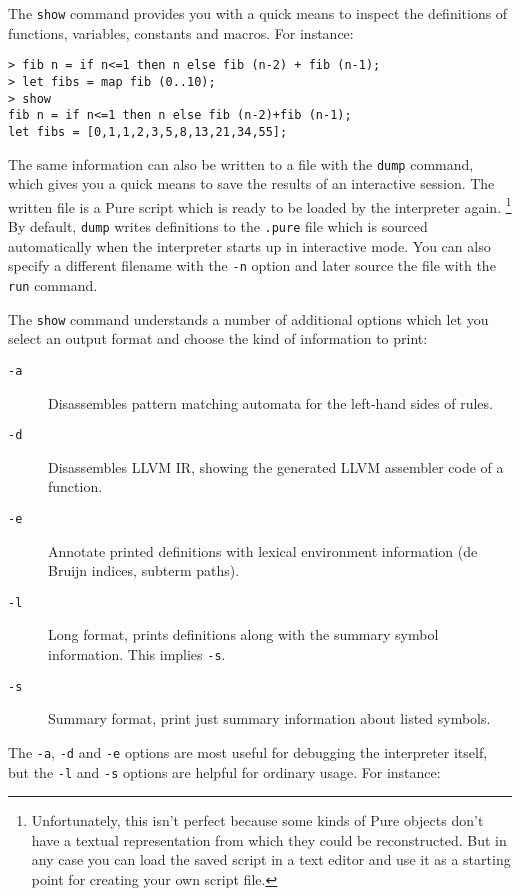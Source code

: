 \documentclass[a4paper,12pt]{article}
\begin{document}
The \verb|show| command provides you with a quick means to inspect the definitions of functions, variables, constants and macros. For instance:

\begin{lstlisting}
> fib n = if n<=1 then n else fib (n-2) + fib (n-1);
> let fibs = map fib (0..10);
> show
fib n = if n<=1 then n else fib (n-2)+fib (n-1);
let fibs = [0,1,1,2,3,5,8,13,21,34,55];
\end{lstlisting}

The same information can also be written to a file with the \verb|dump| command, which gives you a quick means to save the results of an interactive session. The written file is a Pure script which is ready to be loaded by the interpreter again.%
\footnote{Unfortunately, this isn't perfect because some kinds of Pure objects don't have a textual representation from which they could be reconstructed. But in any case you can load the saved script in a text editor and use it as a starting point for creating your own script file.}
By default, \verb|dump| writes definitions to the \texttt{.pure} file which is sourced automatically when the interpreter starts up in interactive mode. You can also specify a different filename with the \verb|-n| option and later source the file with the \verb|run| command.

The \verb|show| command understands a number of additional options which let you select an output format and choose the kind of information to print:

\begin{description}
\item[\rm\texttt{-a}] Disassembles pattern matching automata for the left-hand sides of rules.
\item[\rm\texttt{-d}] Disassembles LLVM IR, showing the generated LLVM assembler code of a function.
\item[\rm\texttt{-e}] Annotate printed definitions with lexical environment information (de Bruijn indices, subterm paths).
\item[\rm\texttt{-l}] Long format, prints definitions along with the summary symbol information. This implies \texttt{-s}.
\item[\rm\texttt{-s}] Summary format, print just summary information about listed symbols.
\end{description}

The \verb|-a|, \verb|-d| and \verb|-e| options are most useful for debugging the interpreter itself, but the \verb|-l| and \verb|-s| options are helpful for ordinary usage. For instance:
\end{document}
